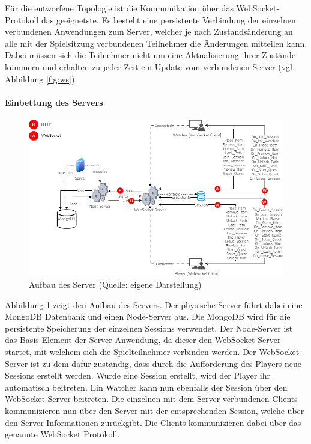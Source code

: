 Für die entworfene Topologie ist die Kommunikation über das WebSocket-Protokoll das geeignetste. Es besteht eine persistente Verbindung der einzelnen verbundenen Anwendungen zum Server, welcher je nach Zustandsänderung an alle mit der Spielsitzung verbundenen Teilnehmer die Änderungen mitteilen kann. Dabei müssen sich die Teilnehmer nicht um eine Aktualisierung ihrer Zustände kümmern und erhalten zu jeder Zeit ein Update vom verbundenen Server (vgl. Abbildung \ref{fig:ws}).

\paragraph{Einbettung des Servers}

\begin{figure}[ht]
\centering
\includegraphics[width=1\linewidth]{content/pictures/Server-System.png}
\caption{Aufbau des Server (Quelle: eigene Darstellung)}
\label{fig:cm-server}
\end{figure}

Abbildung \ref{fig:cm-server} zeigt den Aufbau des Servers. Der physische Server führt dabei eine MongoDB Datenbank und einen Node-Server aus. Die MongoDB wird für die persistente Speicherung der einzelnen Sessions verwendet. Der Node-Server ist das Basis-Element der Server-Anwendung, da dieser den WebSocket Server startet, mit welchem sich die Spielteilnehmer verbinden werden. Der WebSocket Server ist zu dem dafür zuständig, dass durch die Aufforderung des Players neue Sessions erstellt werden. Wurde eine Session erstellt, wird der Player ihr automatisch beitreten. Ein Watcher kann nun ebenfalls der Session über den WebSocket Server beitreten. Die einzelnen mit dem Server verbundenen Clients kommunizieren nun über den Server mit der entsprechenden Session, welche über den Server Informationen zurückgibt. Die Clients kommunizieren dabei über das genannte WebSocket Protokoll.


